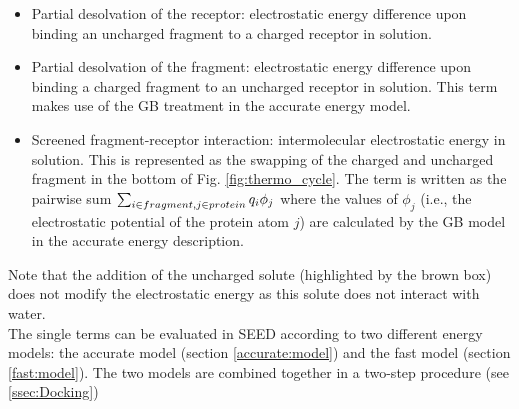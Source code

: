 \documentclass[a4paper,12pt,titlepage]{article}
\begin{document}
\begin{itemize}
\item Partial desolvation of the receptor: electrostatic energy difference 
      upon binding an uncharged fragment to a charged receptor
      in solution.
\item Partial desolvation of the fragment: electrostatic energy difference 
      upon binding a charged fragment to an uncharged receptor in 
      solution. This term makes use of the GB treatment in the accurate energy model.
\item Screened fragment-receptor interaction: intermolecular 
      electrostatic energy in solution. This is represented as the swapping of 
      the charged and uncharged fragment in the bottom of Fig. \ref{fig:thermo_cycle}. 
      The term is written as the pairwise sum 
      $\sum_{i \in fragment, \\ j \in protein} q_i \phi_j$ 
      where the values of $\phi_j$ (i.e., the electrostatic potential of the protein atom $j$) are calculated by the GB model in the accurate energy description.
\end{itemize}
Note that the addition of the uncharged solute (highlighted 
by the brown box) does not modify the electrostatic energy as this solute 
does not interact with water.
\\
The single terms can be evaluated in SEED according to two different energy models: the accurate model (section \ref{accurate:model}) and the fast model (section \ref{fast:model}). The two models are combined together in a two-step procedure (see \ref{ssec:Docking})
\end{document}
